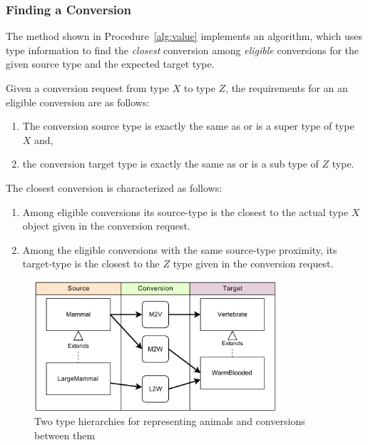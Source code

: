 \subsubsection{Finding a Conversion}
\label{sec:adapter:find}
The  method shown in Procedure~\ref{alg:value} implements an algorithm, which uses type information to find the \emph{closest} conversion among \emph{eligible} conversions for the given source type and the expected target type. 

Given a conversion request from type $X$ to type $Z$, the requirements for an an eligible conversion are as follows:
\begin{enumerate}[{E}-1]
\item The conversion source type is exactly the same as or is a super type of type $X$ and,
\item the conversion target type is exactly the same as or is a sub type of $Z$ type.
\end{enumerate}

The closest conversion is characterized as follows:
\begin{enumerate}[{C}-1]
\item Among eligible conversions its source-type is the closest to the actual type $X$ object given in the conversion request. 
\item Among the eligible conversions with the same source-type proximity, its target-type is the closest to the $Z$ type given in the conversion request.
\end{enumerate}


\begin{figure}[h]
\centering
\includegraphics[width=0.8\textwidth]{chapteradapters/animals.pdf}
\caption{Two type hierarchies for representing animals and conversions between them}
\label{fig:animals}
\end{figure}


